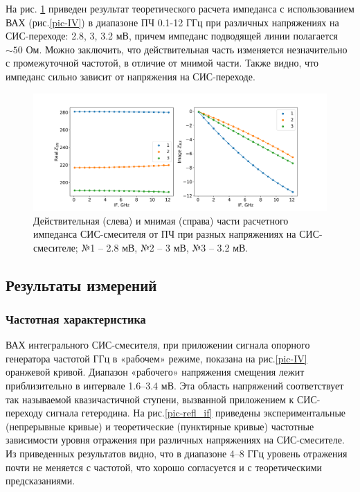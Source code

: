 \documentclass[a4paper]{article}
\begin{document}
На рис. \ref{pic-reim} приведен результат теоретического расчета импеданса с использованием ВАХ (рис.\ref{pic-IV}) в диапазоне ПЧ 0.1-12 ГГц при различных напряжениях на СИС-переходе: 2.8, 3, 3.2 мВ, 
причем импеданс подводящей линии полагается $\sim 50$ Ом. Можно заключить, что действительная часть изменяется незначительно с промежуточной частотой, в отличие от мнимой части. 
Также видно, что импеданс сильно зависит от напряжения на СИС-переходе.

\begin{figure}[H]
    \begin{center}
        \includegraphics[scale=0.4]{reim.png}
        \caption{Действительная (слева) и мнимая (справа) части расчетного импеданса СИС-смесителя от ПЧ при разных напряжениях на СИС-смесителе; №1 – 2.8 мВ, №2 – 3 мВ, №3 – 3.2 мВ.}
        \label{pic-reim}
    \end{center}
\end{figure}


\subsection{Результаты измерений}

\subsubsection{Частотная характеристика}

 ВАХ интегрального СИС-смесителя, при приложении сигнала опорного генератора частотой  ГГц в «рабочем» режиме, показана на рис.\ref{pic-IV}  оранжевой кривой. Диапазон «рабочего» напряжения смещения лежит приблизительно в интервале 1.6–3.4 мВ. Эта область напряжений соответствует так называемой квазичастичной ступени, вызванной приложением к СИС-переходу сигнала гетеродина. На рис.\ref{pic-refl_if} приведены экспериментальные (непрерывные кривые) и теоретические (пунктирные кривые) частотные зависимости уровня отражения при различных напряжениях на СИС-смесителе. Из приведенных результатов видно, что в диапазоне 4–8 ГГц уровень отражения почти не меняется с частотой, что хорошо согласуется и с теоретическими предсказаниями. 
 
\end{document}
